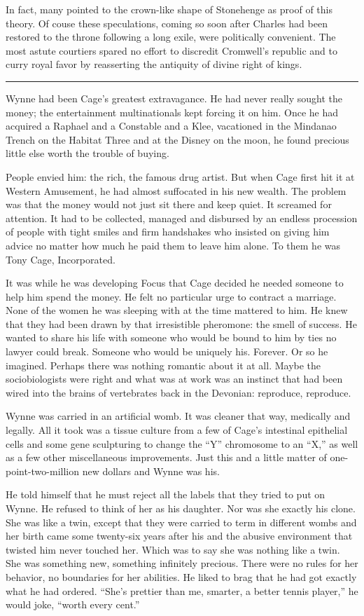 In fact, many pointed to the crown-like shape of Stonehenge as proof of this theory. Of couse these speculations, coming so soon after Charles had been restored to the throne following a long exile, were politically convenient. The most astute courtiers spared no effort to discredit Cromwell's republic and to curry royal favor by reasserting the antiquity of divine right of kings.

\fancybreak{* * *}

Wynne had been Cage's greatest extravagance. He had never really sought the money; the entertainment multinationals kept forcing it on him. Once he had acquired a Raphael and a Constable and a Klee, vacationed in the Mindanao Trench on the Habitat Three and at the Disney on the moon, he found precious little else worth the trouble of buying.

People envied him: the rich, the famous drug artist. But when Cage first hit it at Western Amusement, he had almost suffocated in his new wealth. The problem was that the money would not just sit there and keep quiet. It screamed for attention. It had to be collected, managed and disbursed by an endless procession of people with tight smiles and firm handshakes who insisted on giving him advice no matter how much he paid them to leave him alone. To them he was Tony Cage, Incorporated.

It was while he was developing Focus that Cage decided he needed someone to help him spend the money. He felt no particular urge to contract a marriage. None of the women he was sleeping with at the time mattered to him. He knew that they had been drawn by that irresistible pheromone: the smell of success. He wanted to share his life with someone who would be bound to him by ties no lawyer could break. Someone who would be uniquely his. Forever. Or so he imagined. Perhaps there was nothing romantic about it at all. Maybe the sociobiologists were right and what was at work was an instinct that had been wired into the brains of vertebrates back in the Devonian: reproduce, reproduce.

Wynne was carried in an artificial womb. It was cleaner that way, medically and legally. All it took was a tissue culture from a few of Cage's intestinal epithelial cells and some gene sculpturing to change the ``Y'' chromosome to an ``X,'' as well as a few other miscellaneous improvements. Just this and a little matter of one-point-two-million new dollars and Wynne was his.

He told himself that he must reject all the labels that they tried to put on Wynne. He refused to think of her as his daughter. Nor was she exactly his clone. She was like a twin, except that they were carried to term in different wombs and her birth came some twenty-six years after his and the abusive environment that twisted him never touched her. Which was to say she was nothing like a twin. She was something new, something infinitely precious. There were no rules for her behavior, no boundaries for her abilities. He liked to brag that he had got exactly what he had ordered. ``She's prettier than me, smarter, a better tennis player,'' he would joke, ``worth every cent.''

